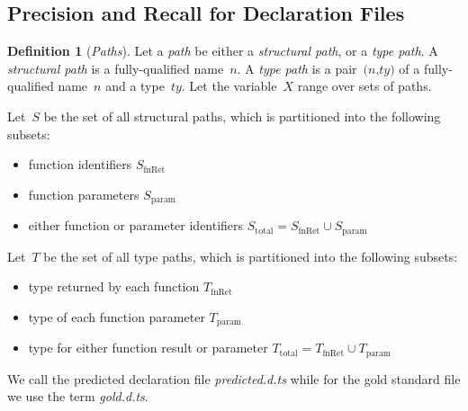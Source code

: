 \documentclass[sigplan,10pt,review,anonymous]{acmart} %
\newcommand{\margincomment}[2]{\marginpar{\scriptsize\color{Maroon}#1 says: #2}}
\newcommand{\ivp}[1]{\margincomment{IVP}{#1}}
\theoremstyle{plain}
\theoremstyle{remark}
\theoremstyle{definition}
\newtheorem{defn}{Definition}[section]
\begin{document}
\subsection{Precision and Recall for Declaration Files}

\begin{defn}[\emph{Paths}]
  Let a \emph{path} be either a \emph{structural path}, or a \emph{type path}.
  A \emph{structural path} is a fully-qualified name~$\textit{n}$.
  A \emph{type path} is a pair~$\textit{(n,ty)}$ of a fully-qualified name~$\textit{n}$ and a type~$\textit{ty}$.
  Let the variable~$X$ range over sets of paths.
\end{defn}

Let~$S$ be the set of all structural paths,
which is partitioned into the following subsets:
\begin{itemize}[label={\tiny$\bullet$}]
  \item function identifiers $S_\text{fnRet}$
  \item function  parameters $S_\text{param}$
  \item either function or parameter identifiers $S_\text{total} = S_\text{fnRet} \cup S_\text{param}$
\end{itemize}

Let~$T$ be the set of all type paths,
which is partitioned into the following subsets:
\begin{itemize}[label={\tiny$\bullet$}]
  \item type returned by each function $T_\text{fnRet}$
  \item type of each function parameter $T_\text{param}$
  \item type for either function result or parameter $T_\text{total} = T_\text{fnRet} \cup T_\text{param}$
\end{itemize}

We call the predicted declaration file \emph{predicted.d.ts}
while for the gold standard file we use the term \emph{gold.d.ts}.
\end{document}
